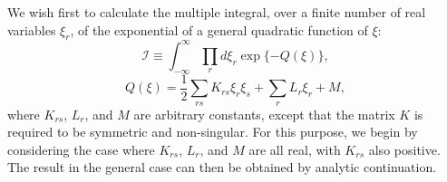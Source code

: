 

We wish first to calculate the multiple integral, over a finite number of
real variables $\xi_r$, of the exponential of a general quadratic function
of $\xi$:
\begin{equation}
  \mathcal{I}\equiv\int_{-\infty}^{\infty}\prod_r d\xi_r
  \exp\{-Q(\xi)\},
  \tag{9.A.1}\label{eq:9.A.1}
\end{equation}
\begin{equation}
  Q(\xi)=\frac{1}{2}\sum_{rs}K_{rs}\xi_r\xi_s
  +\sum_r L_r\xi_r+M,
  \tag{9.A.2}\label{eq:9.A.2}
\end{equation}
where $K_{rs}$, $L_r$, and $M$ are arbitrary constants, except that the
matrix $K$ is required to be symmetric and non-singular. For this purpose,
we begin by considering the case where $K_{rs}$, $L_r$, and $M$ are all
real, with $K_{rs}$ also positive. The result in the general case can then
be obtained by analytic continuation.

